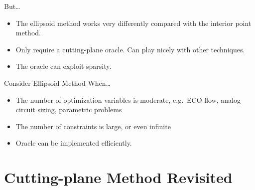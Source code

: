 \documentclass[10pt,ignorenonframetext,serif,onlymath]{beamer}
\begin{document}
\begin{frame}{But\ldots{}}
\protect\hypertarget{but}{}

\begin{itemize}
\item
  The ellipsoid method works very differently compared with the interior
  point method.
\item
  Only require a cutting-plane oracle. Can play nicely with other
  techniques.
\item
  The oracle can exploit sparsity.
\end{itemize}

\end{frame}

\begin{frame}{Consider Ellipsoid Method When\ldots{}}
\protect\hypertarget{consider-ellipsoid-method-when}{}

\begin{itemize}
\item
  The number of optimization variables is moderate, e.g.~ECO flow,
  analog circuit sizing, parametric problems
\item
  The number of constraints is large, or even infinite
\item
  Oracle can be implemented efficiently.
\end{itemize}

\end{frame}

\hypertarget{cutting-plane-method-revisited}{%
\section{Cutting-plane Method
Revisited}\label{cutting-plane-method-revisited}}
\end{document}
